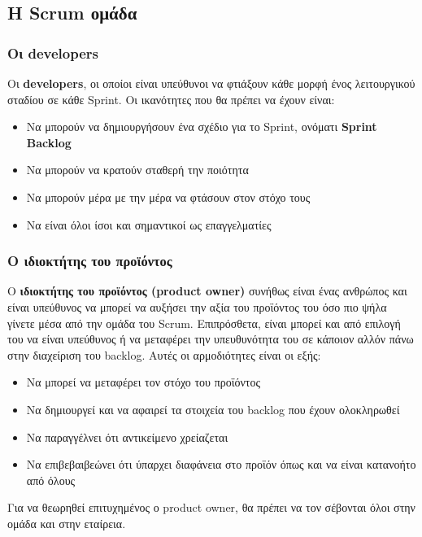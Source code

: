 \newpage
\subsection{Η Scrum ομάδα}
\subsubsection{Οι developers}

Οι \textbf{developers}, οι οποίοι είναι υπεύθυνοι να φτιάξουν κάθε μορφή ένος λειτουργικού σταδίου σε κάθε Sprint.
Οι ικανότητες που θα πρέπει να έχουν είναι:

\begin{itemize}
    \item Να μπορούν να δημιουργήσουν ένα σχέδιο για το Sprint, ονόματι \textbf{Sprint Backlog}
    \item Να μπορούν να κρατούν σταθερή την ποιότητα
    \item Να μπορούν μέρα με την μέρα να φτάσουν στον στόχο τους
    \item Να είναι όλοι ίσοι και σημαντικοί ως επαγγελματίες
\end{itemize}

\subsubsection{Ο ιδιοκτήτης του προϊόντος}

Ο \textbf{ιδιοκτήτης του προϊόντος (product owner)} συνήθως είναι ένας ανθρώπος και είναι υπεύθυνος να μπορεί να αυξήσει την αξία του προϊόντος του όσο πιο ψήλα γίνετε μέσα από την ομάδα του Scrum.
Επιπρόσθετα, είναι μπορεί και από επιλογή του να είναι υπεύθυνος ή να μεταφέρει την υπευθυνότητα του σε κάποιον αλλόν πάνω στην διαχείριση του backlog. Αυτές οι αρμοδιότητες είναι οι εξής:

\begin{itemize}
    \item Να μπορεί να μεταφέρει τον στόχο του προϊόντος
    \item Να δημιουργεί και να αφαιρεί τα στοιχεία του backlog που έχουν ολοκληρωθεί
    \item Να παραγγέλνει ότι αντικείμενο χρείαζεται
    \item Να επιβεβαιβεώνει ότι ύπαρχει διαφάνεια στο προϊόν όπως και να είναι κατανοήτο από όλους
\end{itemize}

Για να θεωρηθεί επιτυχημένος ο product owner, θα πρέπει να τον σέβονται όλοι στην ομάδα και στην εταίρεια. 

